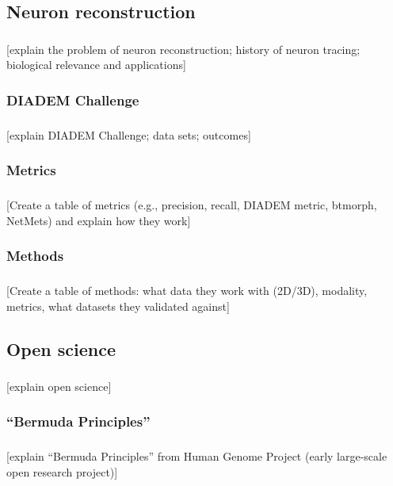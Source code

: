 \documentclass{beamer}
\newcommand{\tbackground}[1]{#1}
\newcommand{\tbackground}[1]{\textcolor{tbackground}{#1}}
\begin{document}
\subsection{Neuron reconstruction}
\begin{frame}\frametitle{\subsecname}
	[\tbackground{explain the problem of neuron reconstruction; history of
	neuron tracing; biological relevance and applications}]
\end{frame}

\subsubsection{DIADEM Challenge}
\begin{frame}\frametitle{\subsubsecname}
	[\tbackground{explain DIADEM Challenge; data sets; outcomes}]
\end{frame}

\subsubsection{Metrics}
\begin{frame}\frametitle{\subsubsecname}
	[\tbackground{Create a table of metrics (e.g., precision, recall,
	DIADEM metric, btmorph, NetMets) and explain how they work}]
\end{frame}

\subsubsection{Methods}
\begin{frame}\frametitle{\subsubsecname}
	[\tbackground{Create a table of methods: what data they work with (2D/3D), modality,
	metrics, what datasets they validated against}]
\end{frame}

\subsection{Open science}
\begin{frame}\frametitle{\subsecname}
	[\tbackground{explain open science}]
\end{frame}

\subsubsection{``Bermuda Principles''}
\begin{frame}\frametitle{\subsubsecname}
	[\tbackground{explain ``Bermuda Principles'' from Human Genome Project
	(early large-scale open research project)}]
\end{frame}
\end{document}
